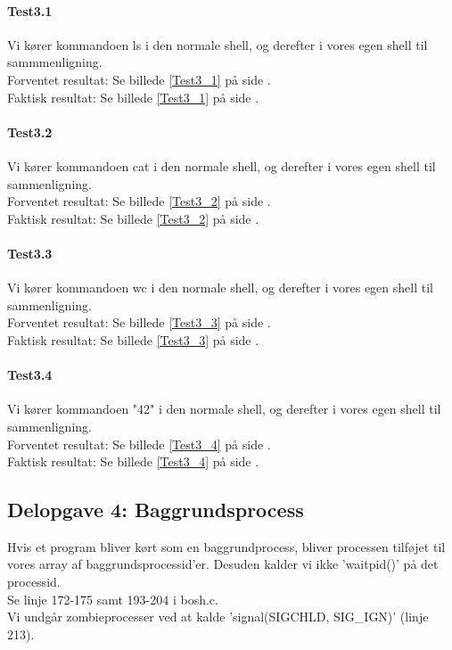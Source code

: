 \paragraph{Test3.1}
Vi kører kommandoen ls i den normale shell, og derefter i vores egen shell til sammmenligning.
\\Forventet resultat: Se billede \ref{Test3_1} på side \pageref{Test3_1}.
\\Faktisk resultat: Se billede \ref{Test3_1} på side \pageref{Test3_1}.

\paragraph{Test3.2}
Vi kører kommandoen cat i den normale shell, og derefter i vores egen shell til sammenligning.
\\Forventet resultat: Se billede \ref{Test3_2} på side \pageref{Test3_2}.
\\Faktisk resultat: Se billede \ref{Test3_2} på side \pageref{Test3_2}.

\paragraph{Test3.3}
Vi kører kommandoen wc i den normale shell, og derefter i vores egen shell til sammenligning.
\\Forventet resultat: Se billede \ref{Test3_3} på side \pageref{Test3_3}.
\\Faktisk resultat: Se billede \ref{Test3_3} på side \pageref{Test3_3}.

\paragraph{Test3.4}
Vi kører kommandoen "42" i den normale shell, og derefter i vores egen shell til sammenligning.
\\Forventet resultat: Se billede \ref{Test3_4} på side \pageref{Test3_4}.
\\Faktisk resultat: Se billede \ref{Test3_4} på side \pageref{Test3_4}.

\subsection{Delopgave 4: Baggrundsprocess}
\label{D4}
Hvis et program bliver kørt som en baggrundprocess, bliver processen tilføjet til vores array af baggrundsprocessid'er. Desuden kalder vi ikke 'waitpid()' på det processid. 
\\Se linje 172-175 samt 193-204 i bosh.c.
\\Vi undgår zombieprocesser ved at kalde 'signal(SIGCHLD, SIG\_IGN)' (linje 213).
